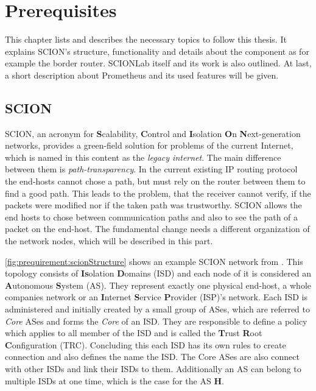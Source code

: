 \documentclass[thesis.tex]{subfiles}
\begin{document}
\chapter{Prerequisites}\label{chap:preq}

This chapter lists and describes the necessary topics to follow this thesis. It explains SCION's structure, functionality and details about the component as for example the border router. SCIONLab itself and its work is also outlined. At last, a short description about Prometheus and its used features will be given.

\section{SCION} \cite{SCIONPaper} \cite{SCIONBook}

SCION, an acronym for \textbf{S}calability, \textbf{C}ontrol and \textbf{I}solation \textbf{O}n \textbf{N}ext-generation networks, provides a green-field solution for problems of the current Internet, which is named in this content as the \textit{legacy internet}. The main difference between them is \textit{path-transparency}. In the current existing IP routing protocol the end-hosts cannot chose a path, but must rely on the router between them to find a good path. This leads to the problem, that the receiver cannot verify, if the packets were modified nor if the taken path was trustworthy. SCION allows the end hosts to chose between communication paths and also to see the path of a packet on the end-host. The fundamental change needs a different organization of the network nodes, which will be described in this part.

\autoref{fig:prequirement:scionStructure} shows an example SCION network from \cite{SCIONPaper}. This topology consists of \textbf{Is}olation \textbf{D}omains (ISD) and each node of it is considered an \textbf{A}utonomous \textbf{S}ystem (AS). They represent exactly one physical end-host, a whole companies network or an \textbf{I}nternet \textbf{S}ervice \textbf{P}rovider (ISP)'s network. Each ISD is administered and initially created by a small group of ASes, which are referred to \textit{Core} ASes and forms the \textit{Core} of an ISD. They are responsible to define a policy which applies to all member of the ISD and is called the \textbf{T}rust \textbf{R}oot \textbf{C}onfiguration (TRC). Concluding this each ISD has its own rules to create connection and also defines the name the ISD. The Core ASes are also connect with other ISDs and link their ISDs to them. Additionally an AS can belong to multiple ISDs at one time, which is the case for the AS \textbf{H}.
\end{document}

